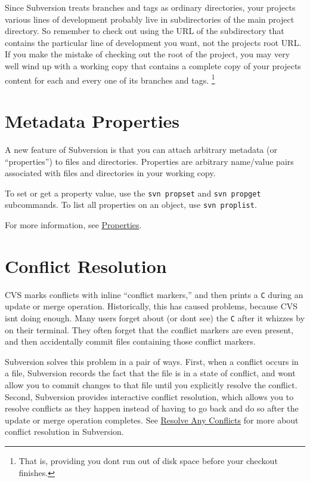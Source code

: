 Since Subversion treats branches and tags as ordinary directories, your
project\textquotesingle s various lines of development probably live in
subdirectories of the main project directory. So remember to check out
using the URL of the subdirectory that contains the particular line of
development you want, not the project\textquotesingle s root URL. If you
make the mistake of checking out the root of the project, you may very
well wind up with a working copy that contains a complete copy of your
project\textquotesingle s content for each and every one of its branches
and tags. \footnote{That is, providing you don\textquotesingle t run out
  of disk space before your checkout finishes.}

\section{Metadata Properties}\label{svn.forcvs.properties}

A new feature of Subversion is that you can attach arbitrary metadata
(or ``properties'') to files and directories. Properties are arbitrary
name/value pairs associated with files and directories in your working
copy.

To set or get a property value, use the \texttt{svn\ propset} and
\texttt{svn\ propget} subcommands. To list all properties on an object,
use \texttt{svn\ proplist}.

For more information, see \hyperref[svn.advanced.props]{Properties}.

\section{Conflict Resolution}\label{svn.forcvs.conflicts}

CVS marks conflicts with inline ``conflict markers,'' and then prints a
\texttt{C} during an update or merge operation. Historically, this has
caused problems, because CVS isn\textquotesingle t doing enough. Many
users forget about (or don\textquotesingle t see) the \texttt{C} after
it whizzes by on their terminal. They often forget that the conflict
markers are even present, and then accidentally commit files containing
those conflict markers.

Subversion solves this problem in a pair of ways. First, when a conflict
occurs in a file, Subversion records the fact that the file is in a
state of conflict, and won\textquotesingle t allow you to commit changes
to that file until you explicitly resolve the conflict. Second,
Subversion provides interactive conflict resolution, which allows you to
resolve conflicts as they happen instead of having to go back and do so
after the update or merge operation completes. See
\hyperref[svn.tour.cycle.resolve]{Resolve Any Conflicts} for more about
conflict resolution in Subversion.

